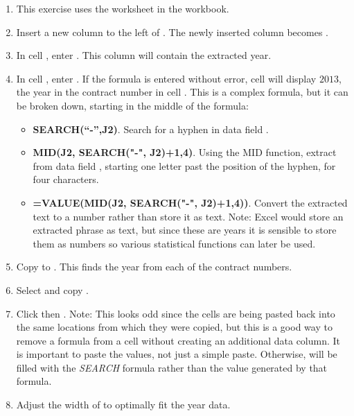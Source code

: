 \begin{enumerate}
	\item This exercise uses the  worksheet in the  workbook.
	\item Insert a new column to the left of . The newly inserted column becomes .
	\item In cell , enter . This column will contain the extracted year.
	\item In cell , enter . If the formula is entered without error, cell  will display $ 2013 $, the year in the contract number in cell . This is a complex formula, but it can be broken down, starting in the middle of the formula: 
	
	\begin{itemize}
		\item \textbf{SEARCH(``-'',J2)}. Search for a hyphen in data field .
		\item \textbf{MID(J2, SEARCH("-", J2)+1,4)}. Using the MID function, extract from data field , starting one letter past the position of the hyphen, for four characters.
		\item \textbf{=VALUE(MID(J2, SEARCH("-", J2)+1,4))}. Convert the extracted text to a number rather than store it as text. Note: Excel would store an extracted phrase as text, but since these are years it is sensible to store them as numbers so various statistical functions can later be used.
	\end{itemize}

	\item Copy  to . This finds the year from each of the contract numbers.
	\item Select and copy .
	\item Click  then . Note: This looks odd since the cells are being pasted back into the same locations from which they were copied, but this is a good way to remove a formula from a cell without creating an additional data column. It is important to paste the values, not just a simple paste. Otherwise,  will be filled with the \textit{SEARCH} formula rather than the value generated by that formula.
	\item Adjust the width of  to optimally fit the year data.
	

\end{enumerate}
